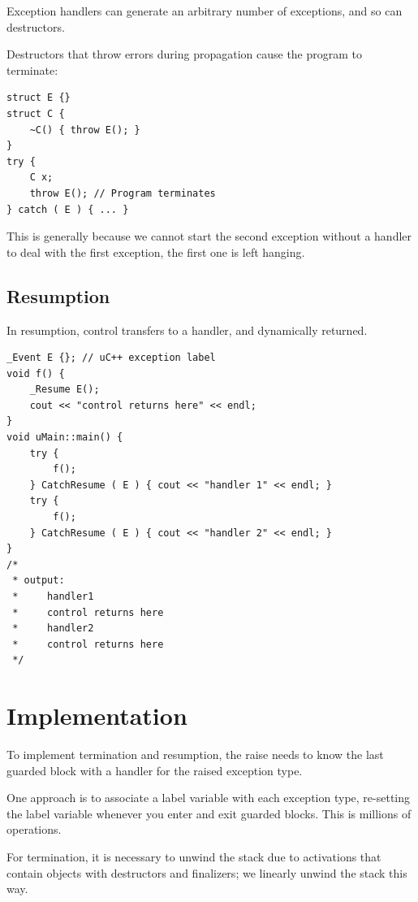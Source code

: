                 Exception handlers can generate an arbitrary number of exceptions, and so can destructors.

                Destructors that throw errors during propagation cause the program to terminate:
                    \begin{lstlisting}
struct E {}
struct C {
    ~C() { throw E(); }
}
try {
    C x;
    throw E(); // Program terminates
} catch ( E ) { ... }
                    \end{lstlisting}
                This is generally because we cannot start the second exception without a handler to deal with the first exception, the first one is left hanging.
            \subsection{Resumption} %
            \label{sub:resumption}
                In resumption, control transfers to a handler, and dynamically returned.
                    \begin{lstlisting}
_Event E {}; // uC++ exception label
void f() {
    _Resume E();
    cout << "control returns here" << endl;
}
void uMain::main() {
    try {
        f();
    } CatchResume ( E ) { cout << "handler 1" << endl; }
    try {
        f();
    } CatchResume ( E ) { cout << "handler 2" << endl; }
}
/*
 * output:
 *     handler1
 *     control returns here
 *     handler2
 *     control returns here
 */
                    \end{lstlisting}

        \section{Implementation} %
        \label{sec:implementation}
            To implement termination and resumption, the raise needs to know the last guarded block with a handler for the raised exception type.

            One approach is to associate a label variable with each exception type, re-setting the label variable whenever you enter and exit guarded blocks.
            This is millions of operations.

            For termination, it is necessary to unwind the stack due to activations that contain objects with destructors and finalizers; we linearly unwind the stack this way.

